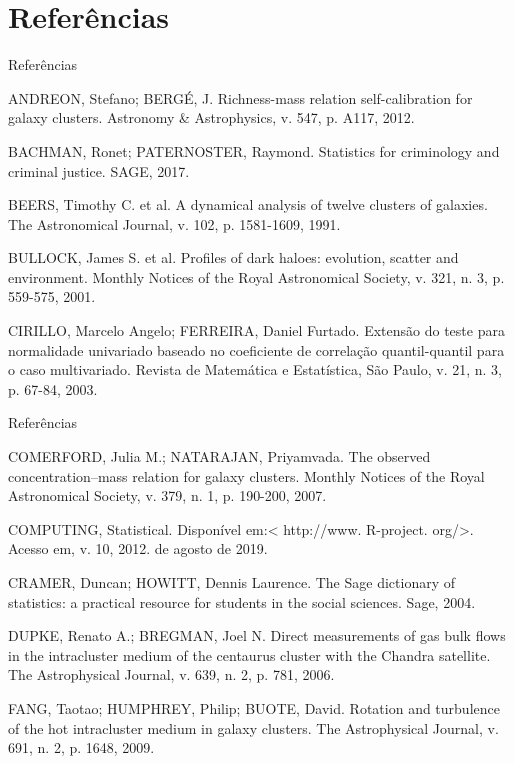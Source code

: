 \documentclass[xcolor=dvipsnames,10pt]{beamer}
\begin{document}
\section{Referências}
\begin{frame}{Referências}
  \begin{thebibliography}{9}
  \fontsize{8}{0}\selectfont
      ANDREON, Stefano; BERGÉ, J. Richness-mass relation self-calibration for galaxy clusters. Astronomy \& Astrophysics, v. 547, p. A117, 2012.

      BACHMAN, Ronet; PATERNOSTER, Raymond. Statistics for criminology and criminal justice. SAGE, 2017.

      BEERS, Timothy C. et al. A dynamical analysis of twelve clusters of galaxies. The Astronomical Journal, v. 102, p. 1581-1609, 1991.

      BULLOCK, James S. et al. Profiles of dark haloes: evolution, scatter and environment. Monthly Notices of the Royal Astronomical Society, v. 321, n. 3, p. 559-575, 2001.

      CIRILLO, Marcelo Angelo; FERREIRA, Daniel Furtado. Extensão do teste para normalidade univariado baseado no coeficiente de correlação quantil-quantil para o caso multivariado. Revista de Matemática e Estatística, São Paulo, v. 21, n. 3, p. 67-84, 2003.

  \end{thebibliography}
\end{frame}

\begin{frame}{Referências}
  \begin{thebibliography}{9}
  \fontsize{8}{0}\selectfont
  COMERFORD, Julia M.; NATARAJAN, Priyamvada. The observed concentration–mass relation for galaxy clusters. Monthly Notices of the Royal Astronomical Society, v. 379, n. 1, p. 190-200, 2007.

  COMPUTING, Statistical. Disponível em:< http://www. R-project. org/>. Acesso em, v. 10, 2012. de agosto de 2019.

  CRAMER, Duncan; HOWITT, Dennis Laurence. The Sage dictionary of statistics: a practical resource for students in the social sciences. Sage, 2004.

  DUPKE, Renato A.; BREGMAN, Joel N. Direct measurements of gas bulk flows in the intracluster medium of the centaurus cluster with the Chandra satellite. The Astrophysical Journal, v. 639, n. 2, p. 781, 2006.

  FANG, Taotao; HUMPHREY, Philip; BUOTE, David. Rotation and turbulence of the hot intracluster medium in galaxy clusters. The Astrophysical Journal, v. 691, n. 2, p. 1648, 2009.
  \end{thebibliography}
\end{frame}
\end{document}
